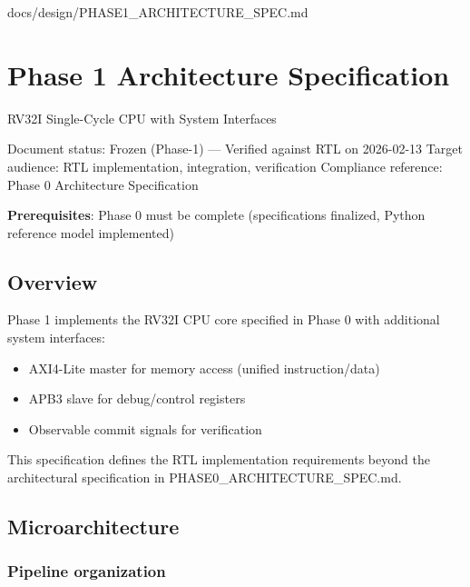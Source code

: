 \begin{relocated}{docs/design/PHASE1_ARCHITECTURE_SPEC.md}
\section{Phase 1 Architecture Specification}\label{ds:ch:phase1-architecture}

RV32I Single-Cycle CPU with System Interfaces

Document status: Frozen (Phase-1) --- Verified against RTL on 2026-02-13
Target audience: RTL implementation, integration, verification
Compliance reference: Phase 0 Architecture Specification

\textbf{Prerequisites}: Phase 0 must be complete (specifications
finalized, Python reference model implemented)

\subsection{Overview}\label{ds:ch:phase1-architecture:overview}

Phase 1 implements the RV32I CPU core specified in Phase 0 with
additional system interfaces:

\begin{itemize}
\tightlist
\item
  AXI4-Lite master for memory access (unified
  instruction/\allowbreak{}data)
\item
  APB3 slave for debug/\allowbreak{}control registers
\item
  Observable commit signals for verification
\end{itemize}

This specification defines the RTL implementation requirements beyond
the architectural specification in
PHASE0\_\allowbreak{}ARCHITECTURE\_\allowbreak{}SPEC.md.

\subsection{Microarchitecture}\label{ds:ch:phase1-architecture:microarchitecture}

\subsubsection{Pipeline organization}\label{ds:ch:phase1-architecture:pipeline-organization}


\end{relocated}
